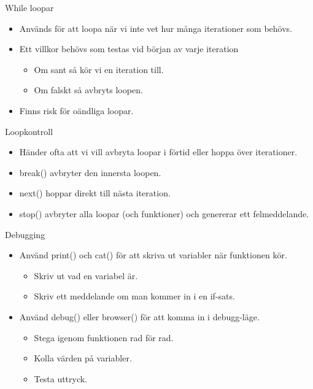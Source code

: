 \documentclass[
  11pt,
  ignorenonframetext,
]{beamer}
\providecommand{\tightlist}{%
  \setlength{\itemsep}{0pt}\setlength{\parskip}{0pt}}
\begin{document}
\begin{frame}{While loopar}
\protect\hypertarget{while-loopar}{}
\begin{itemize}
\tightlist
\item
  Används för att loopa när vi inte vet hur många iterationer som
  behövs.
\item
  Ett villkor behövs som testas vid början av varje iteration

  \begin{itemize}
  \tightlist
  \item
    Om sant så kör vi en iteration till.
  \item
    Om falskt så avbryts loopen.
  \end{itemize}
\item
  Finns risk för oändliga loopar.
\end{itemize}
\end{frame}

\begin{frame}{Loopkontroll}
\protect\hypertarget{loopkontroll}{}
\begin{itemize}
\tightlist
\item
  Händer ofta att vi vill avbryta loopar i förtid eller hoppa över
  iterationer.
\item
  break() avbryter den innersta loopen.
\item
  next() hoppar direkt till nästa iteration.
\item
  stop() avbryter alla loopar (och funktioner) och genererar ett
  felmeddelande.
\end{itemize}
\end{frame}

\begin{frame}{Debugging}
\protect\hypertarget{debugging}{}
\begin{itemize}
\tightlist
\item
  Använd print() och cat() för att skriva ut variabler när funktionen
  kör.

  \begin{itemize}
  \tightlist
  \item
    Skriv ut vad en variabel är.
  \item
    Skriv ett meddelande om man kommer in i en if-sats.
  \end{itemize}
\item
  Använd debug() eller browser() för att komma in i debugg-läge.

  \begin{itemize}
  \tightlist
  \item
    Stega igenom funktionen rad för rad.
  \item
    Kolla värden på variabler.
  \item
    Testa uttryck.
  \end{itemize}
\end{itemize}
\end{frame}
\end{document}

